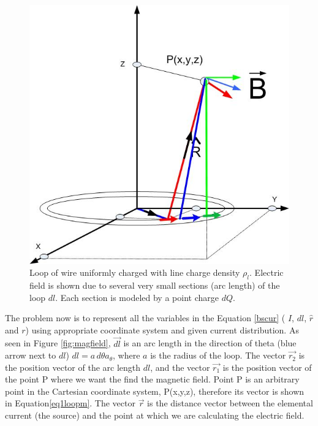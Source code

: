 \documentclass{ximera}
\begin{document}
\begin{figure}[htbp]
\begin{center}
\includegraphics[scale=0.4]{../jpg/bscurrent.jpg}
\end{center}
\caption{Loop of wire uniformly charged with line charge density $\rho_l$. Electric field is shown due to several very small sections (arc length) of the loop $dl$.
Each section is modeled by a point charge $dQ$.}
\label{bscur1}
\end{figure}



The problem now  is to represent all the variables in the Equation \ref{bscur}  ( $I$, $dl$, $\hat{r}$ and $r$) using  appropriate coordinate system and given current distribution.
 As seen in Figure \ref{fig:magfield}, $\vec{dl}$ is an arc length in the direction of theta (blue arrow next to $dl$) $dl=a\, d\theta a_{\theta}$, where $ a$ is the radius of the loop. The vector $\vec{r_2}$ is the position vector of the arc length $dl$, and the vector $\vec{r_1}$  is the position vector of the point P where we want the find the magnetic field. Point P is an arbitrary point in the Cartesian coordinate system, P(x,y,z), therefore its vector is shown in Equation\ref{eq1loopm}.  The vector $\vec{r}$ is the distance vector between the elemental current (the source) and the point at which we are calculating the electric field. 
\end{document}
